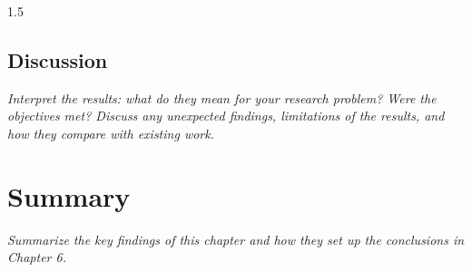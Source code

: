 \begin{spacing}{1.5}
\subsection{Discussion}

\textit{Interpret the results: what do they mean for your research problem? Were the objectives met? Discuss any unexpected findings, limitations of the results, and how they compare with existing work.}

\section{Summary}

\textit{Summarize the key findings of this chapter and how they set up the conclusions in Chapter 6.}

\end{spacing}

